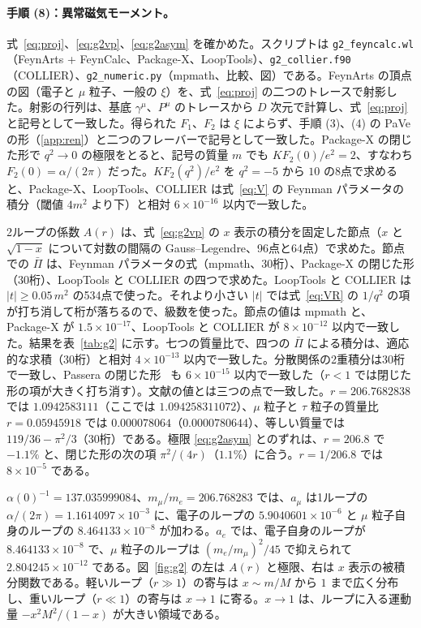 \documentclass[a4paper,10pt]{ltjsarticle}
\begin{document}
\paragraph{手順 (8)：異常磁気モーメント。}式~\eqref{eq:proj}、\eqref{eq:g2vp}、\eqref{eq:g2asym} を確かめた。スクリプトは \texttt{g2\_feyncalc.wl}（FeynArts + FeynCalc、Package-X、LoopTools）、\texttt{g2\_collier.f90}（COLLIER）、\texttt{g2\_numeric.py}（mpmath、比較、図）である。FeynArts の頂点の図（電子と $\mu$ 粒子、一般の $\xi$）を、式~\eqref{eq:proj} の二つのトレースで射影した。射影の行列は、基底 $\gamma^\mu$、$P^\mu$ のトレースから $D$ 次元で計算し、式~\eqref{eq:proj} と記号として一致した。得られた $F_1$、$F_2$ は $\xi$ によらず、手順 (3)、(4) の PaVe の形（\ref{app:ren}）と二つのフレーバーで記号として一致した。Package-X の閉じた形で $q^2\to0$ の極限をとると、記号の質量 $m$ でも $KF_2(0)/e^2=2$、すなわち $F_2(0)=\alpha/(2\pi)$ だった。$KF_2(q^2)/e^2$ を $q^2=-5$ から $10$ の8点で求めると、Package-X、LoopTools、COLLIER は式~\eqref{eq:V} の Feynman パラメータの積分（閾値 $4m^2$ より下）と相対 $6\times10^{-16}$ 以内で一致した。

2ループの係数 $A(r)$ は、式~\eqref{eq:g2vp} の $x$ 表示の積分を固定した節点（$x$ と $\sqrt{1-x}$ について対数の間隔の Gauss--Legendre、96点と64点）で求めた。節点での $\bar\Pi$ は、Feynman パラメータの式（mpmath、30桁）、Package-X の閉じた形（30桁）、LoopTools と COLLIER の四つで求めた。LoopTools と COLLIER は $|t|\ge0.05\,m^2$ の534点で使った。それより小さい $|t|$ では式~\eqref{eq:VR} の $1/q^2$ の項が打ち消して桁が落ちるので、級数を使った。節点の値は mpmath と、Package-X が $1.5\times10^{-17}$、LoopTools と COLLIER が $8\times10^{-12}$ 以内で一致した。結果を表~\ref{tab:g2} に示す。七つの質量比で、四つの $\bar\Pi$ による積分は、適応的な求積（30桁）と相対 $4\times10^{-13}$ 以内で一致した。分散関係の2重積分は30桁で一致し、Passera の閉じた形~\cite{passera05} も $6\times10^{-15}$ 以内で一致した（$r<1$ では閉じた形の項が大きく打ち消す）。文献の値とは三つの点で一致した。$r=206.7682838$ では $1.0942583111$（ここでは $1.094258311072$）、$\mu$ 粒子と $\tau$ 粒子の質量比 $r=0.05945918$ では $0.000078064$（$0.0000780644$）、等しい質量では $119/36-\pi^2/3$（30桁）である。極限 \eqref{eq:g2asym} とのずれは、$r=206.8$ で $-1.1\%$ と、閉じた形の次の項 $\pi^2/(4r)$（$1.1\%$）に合う。$r=1/206.8$ では $8\times10^{-5}$ である。

$\alpha(0)^{-1}=137.035999084$、$m_\mu/m_e=206.768283$ では、$a_\mu$ は1ループの $\alpha/(2\pi)=1.1614097\times10^{-3}$ に、電子のループの $5.9040601\times10^{-6}$ と $\mu$ 粒子自身のループの $8.464133\times10^{-8}$ が加わる。$a_e$ では、電子自身のループが $8.464133\times10^{-8}$ で、$\mu$ 粒子のループは $(m_e/m_\mu)^2/45$ で抑えられて $2.804245\times10^{-12}$ である。図~\ref{fig:g2} の左は $A(r)$ と極限、右は $x$ 表示の被積分関数である。軽いループ（$r\gg1$）の寄与は $x\sim m/M$ から $1$ まで広く分布し、重いループ（$r\ll1$）の寄与は $x\to1$ に寄る。$x\to1$ は、ループに入る運動量 $-x^2M^2/(1-x)$ が大きい領域である。
\end{document}
